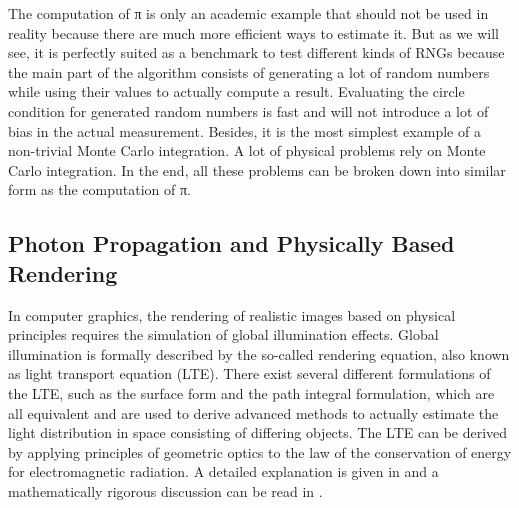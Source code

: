 \documentclass{stdlocal}
\begin{document}

    The computation of π is only an academic example that should not be used in reality because there are much more efficient ways to estimate it.
    But as we will see, it is perfectly suited as a benchmark to test different kinds of RNGs because the main part of the algorithm consists of generating a lot of random numbers while using their values to actually compute a result.
    Evaluating the circle condition for generated random numbers is fast and will not introduce a lot of bias in the actual measurement.
    Besides, it is the most simplest example of a non-trivial Monte Carlo integration.
    A lot of physical problems rely on Monte Carlo integration.
    In the end, all these problems can be broken down into similar form as the computation of π.



  \subsection{Photon Propagation and Physically Based Rendering} %
  \label{sub:photon_propagation_and_physically_based_rendering}
    In computer graphics, the rendering of realistic images based on physical principles requires the simulation of global illumination effects.
    Global illumination is formally described by the so-called rendering equation, also known as light transport equation (LTE).
    There exist several different formulations of the LTE, such as the surface form and the path integral formulation, which are all equivalent and are used to derive advanced methods to actually estimate the light distribution in space consisting of differing objects.
    The LTE can be derived by applying principles of geometric optics to the law of the conservation of energy for electromagnetic radiation.
    A detailed explanation is given in \textcite{pharr2016} and a mathematically rigorous discussion can be read in \textcite{pawellek2017}.
\end{document}
